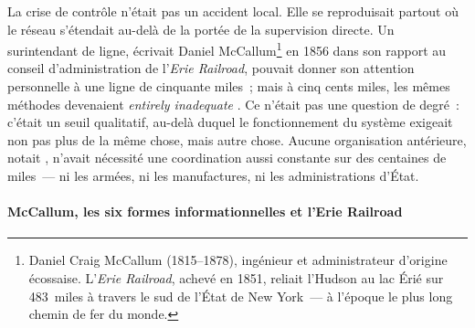La crise de contrôle n'était pas un accident local. Elle se reproduisait partout où le réseau s'étendait au-delà de la portée de la supervision directe. Un surintendant de ligne, écrivait Daniel McCallum\footnote{Daniel Craig McCallum (1815--1878), ingénieur et administrateur d'origine écossaise. L'\emph{Erie Railroad}, achevé en 1851, reliait l'Hudson au lac Érié sur 483~miles à travers le sud de l'État de New York~--- à l'époque le plus long chemin de fer du monde.} en 1856 dans son rapport au conseil d'administration de l'\emph{Erie Railroad}, pouvait donner son attention personnelle à une ligne de cinquante miles~; mais à cinq cents miles, les mêmes méthodes devenaient \og \emph{entirely inadequate}\fg{} \parencite[p.~21--22]{chandler_strategy_1962}. Ce n'était pas une question de degré~: c'était un seuil qualitatif, au-delà duquel le fonctionnement du système exigeait non pas plus de la même chose, mais autre chose. Aucune organisation antérieure, notait \textcite[p.~94]{chandler_visible_1977}, n'avait nécessité une coordination aussi constante sur des centaines de miles~--- ni les armées, ni les manufactures, ni les administrations d'État.

\paragraph{McCallum, les six formes informationnelles et l'Erie Railroad}

